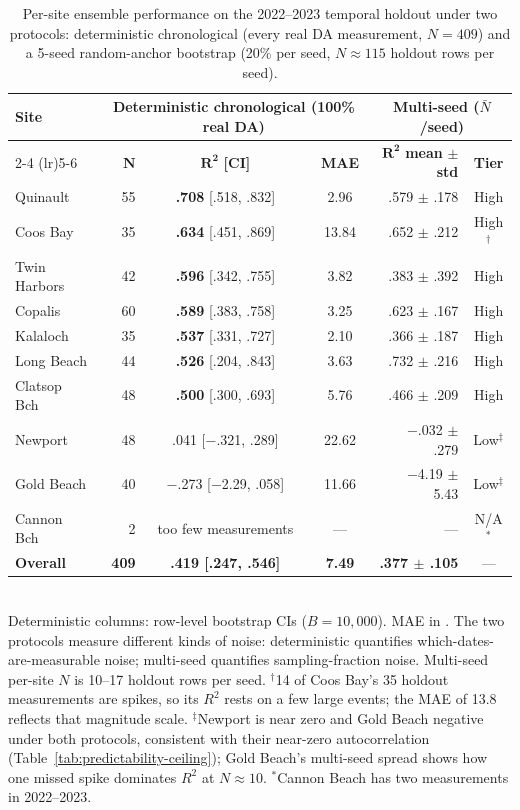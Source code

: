 \documentclass[toxins,article,submit,moreauthors]{Definitions/mdpi}
\begin{document}
\begin{table}[H]
\caption{Per-site ensemble performance on the 2022--2023 temporal holdout under two protocols: deterministic chronological (every real DA measurement, $N = 409$) and a 5-seed random-anchor bootstrap (20\% per seed, $N \approx 115$ holdout rows per seed).}
\label{tab:temporal-holdout}
\centering\scriptsize
\begin{tabular*}{\linewidth}{@{\extracolsep{\fill}}lrccrc}
\toprule
\multirow{2}{*}{\textbf{Site}} & \multicolumn{3}{c}{\textbf{Deterministic chronological} (100\% real DA)} & \multicolumn{2}{c}{\textbf{Multi-seed} ($\bar{N}$/seed)} \\
\cmidrule(lr){2-4} \cmidrule(lr){5-6}
              & $\boldsymbol{N}$ & $\boldsymbol{R^2}$ \textbf{[CI]} & \textbf{MAE} & $\boldsymbol{R^2}$ \textbf{mean} $\pm$ \textbf{std} & \textbf{Tier} \\
\midrule
Quinault      & 55  & \textbf{.708} [.518, .832] & 2.96  & .579 $\pm$ .178 & High \\
Coos Bay      & 35  & \textbf{.634} [.451, .869] & 13.84 & .652 $\pm$ .212 & High$^\dagger$ \\
Twin Harbors  & 42  & \textbf{.596} [.342, .755] & 3.82  & .383 $\pm$ .392 & High \\
Copalis       & 60  & \textbf{.589} [.383, .758] & 3.25  & .623 $\pm$ .167 & High \\
Kalaloch      & 35  & \textbf{.537} [.331, .727] & 2.10  & .366 $\pm$ .187 & High \\
Long Beach    & 44  & \textbf{.526} [.204, .843] & 3.63  & .732 $\pm$ .216 & High \\
Clatsop Bch   & 48  & \textbf{.500} [.300, .693] & 5.76  & .466 $\pm$ .209 & High \\
\addlinespace
Newport       & 48  & .041 [$-$.321, .289] & 22.62 & $-$.032 $\pm$ .279 & Low$^\ddagger$ \\
Gold Beach    & 40  & $-$.273 [$-$2.29, .058] & 11.66 & $-$4.19 $\pm$ 5.43 & Low$^\ddagger$ \\
Cannon Bch    & 2   & too few measurements & --- & --- & N/A$^*$ \\
\midrule
\textbf{Overall} & \textbf{409} & \textbf{.419 [.247, .546]} & \textbf{7.49} & \textbf{.377 $\pm$ .105} & --- \\
\bottomrule
\end{tabular*}
\vspace{0.3em}\\
\footnotesize{Deterministic columns: row-level bootstrap CIs ($B = 10{,}000$). MAE in \si{\microgrampeg}. The two protocols measure different kinds of noise: deterministic quantifies which-dates-are-measurable noise; multi-seed quantifies sampling-fraction noise. Multi-seed per-site $N$ is 10--17 holdout rows per seed. $^\dagger$14 of Coos Bay's 35 holdout measurements are spikes, so its $R^2$ rests on a few large events; the MAE of \SI{13.8}{\microgrampeg} reflects that magnitude scale. $^\ddagger$Newport is near zero and Gold Beach negative under both protocols, consistent with their near-zero autocorrelation (Table~\ref{tab:predictability-ceiling}); Gold Beach's multi-seed spread shows how one missed spike dominates $R^2$ at $N \approx 10$. $^*$Cannon Beach has two measurements in 2022--2023.}

\end{table}
\end{document}
